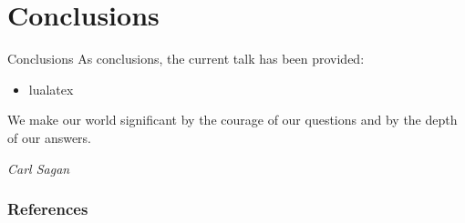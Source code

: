 \documentclass[9pt,xcolor={dvipsnames},handout]{beamer}
\begin{document}
\section{Conclusions}
\begin{frame}{Conclusions}{}
As conclusions, the current talk has been provided:
\begin{itemize}
  \item lualatex
\end{itemize}
\end{frame}

{\aauwavesbg
\begin{frame}
  { \tiny
    \epigraph{\tiny We make our world significant by the courage of our questions and by the depth of our answers.}{\tiny \textit{Carl Sagan}}
  }
\end{frame}}

\begin{frame}[allowframebreaks]
        \frametitle{References}
%
{
\tiny{}


}
\end{frame}
\end{document}
